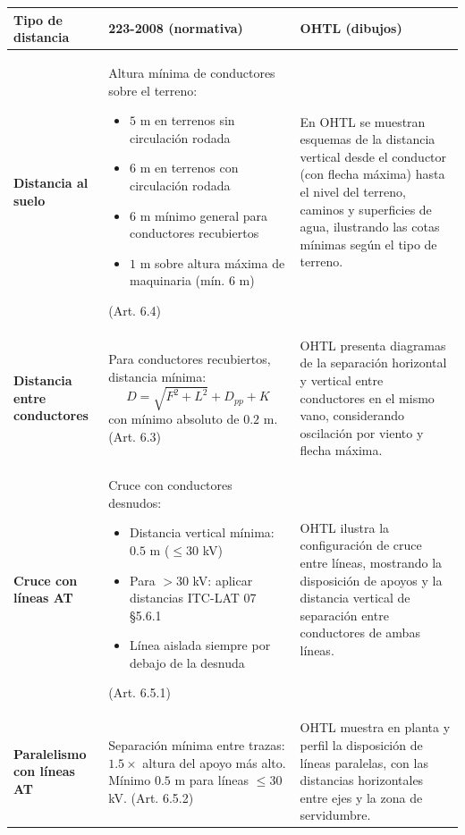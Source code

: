 \documentclass[12pt,a4paper]{article}
\begin{document}
\begin{longtable}{p{3.5cm}p{5cm}p{5cm}}
\toprule
\textbf{Tipo de distancia} & \textbf{223-2008 (normativa)} & \textbf{OHTL (dibujos)} \\
\midrule
\endhead

\bottomrule
\endfoot

\textbf{Distancia al suelo}
&
Altura mínima de conductores sobre el terreno:
\begin{itemize}
    \item $5$ m en terrenos sin circulación rodada
    \item $6$ m en terrenos con circulación rodada
    \item $6$ m mínimo general para conductores recubiertos
    \item $1$ m sobre altura máxima de maquinaria (mín. $6$ m)
\end{itemize}
(Art. 6.4)
&
En OHTL se muestran esquemas de la distancia vertical
desde el conductor (con flecha máxima) hasta el nivel del
terreno, caminos y superficies de agua, ilustrando las
cotas mínimas según el tipo de terreno.
\\

\addlinespace

\textbf{Distancia entre conductores}
&
Para conductores recubiertos, distancia mínima:
\[
D = \sqrt{F^2 + L^2} + D_{pp} + K
\]
con mínimo absoluto de $0.2$ m.
(Art. 6.3)
&
OHTL presenta diagramas de la separación horizontal
y vertical entre conductores en el mismo vano,
considerando oscilación por viento y flecha máxima.
\\

\addlinespace

\textbf{Cruce con líneas AT}
&
Cruce con conductores desnudos:
\begin{itemize}
    \item Distancia vertical mínima: $0.5$ m ($\le 30$ kV)
    \item Para $>30$ kV: aplicar distancias ITC-LAT 07 \S 5.6.1
    \item Línea aislada siempre por debajo de la desnuda
\end{itemize}
(Art. 6.5.1)
&
OHTL ilustra la configuración de cruce entre líneas,
mostrando la disposición de apoyos y la distancia
vertical de separación entre conductores de ambas líneas.
\\

\addlinespace

\textbf{Paralelismo con líneas AT}
&
Separación mínima entre trazas: $1.5 \times$ altura del apoyo
más alto. Mínimo $0.5$ m para líneas $\le 30$ kV.
(Art. 6.5.2)
&
OHTL muestra en planta y perfil la disposición de
líneas paralelas, con las distancias horizontales entre
ejes y la zona de servidumbre.
\\


\end{longtable}
\end{document}
